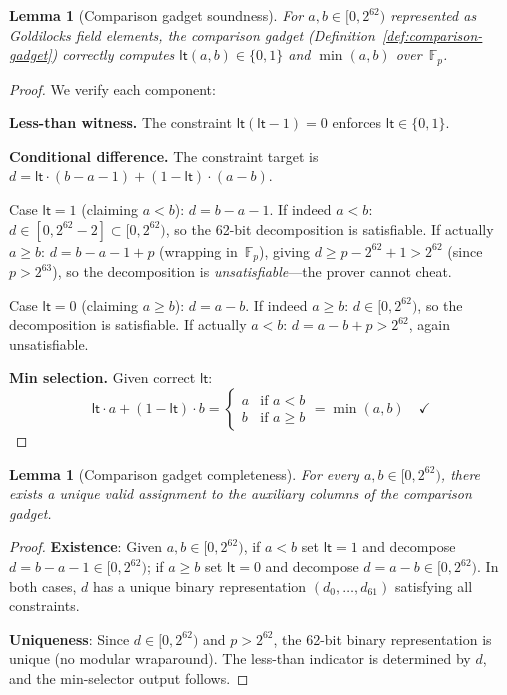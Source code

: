 \documentclass[11pt]{article}
\newtheorem{lemma}[theorem]{Lemma}
\newcommand{\F}{\mathbb{F}}
\begin{document}
\begin{lemma}[Comparison gadget soundness]\label{lem:comparison}
For $a, b \in [0, 2^{62})$ represented as Goldilocks field elements,
the comparison gadget (Definition~\ref{def:comparison-gadget})
correctly computes $\mathsf{lt}(a,b) \in \{0,1\}$ and
$\min(a,b)$ over~$\F_p$.
\end{lemma}

\begin{proof}
We verify each component:

\textbf{Less-than witness.}
The constraint $\mathsf{lt}(\mathsf{lt}-1)=0$ enforces
$\mathsf{lt} \in \{0,1\}$.

\textbf{Conditional difference.}
The constraint target is
$d = \mathsf{lt}\cdot(b - a - 1) + (1 - \mathsf{lt})\cdot(a - b)$.

Case $\mathsf{lt} = 1$ (claiming $a < b$):
$d = b - a - 1$.  If indeed $a < b$: $d \in [0, 2^{62} - 2] \subset [0, 2^{62})$,
so the 62-bit decomposition is satisfiable.
If actually $a \geq b$: $d = b - a - 1 + p$ (wrapping in~$\F_p$),
giving $d \geq p - 2^{62} + 1 > 2^{62}$ (since $p > 2^{63}$),
so the decomposition is \emph{unsatisfiable}---the prover
cannot cheat.

Case $\mathsf{lt} = 0$ (claiming $a \geq b$):
$d = a - b$.  If indeed $a \geq b$: $d \in [0, 2^{62})$,
so the decomposition is satisfiable.
If actually $a < b$: $d = a - b + p > 2^{62}$,
again unsatisfiable.

\textbf{Min selection.}
Given correct $\mathsf{lt}$:
\[
  \mathsf{lt} \cdot a + (1 - \mathsf{lt}) \cdot b
  = \begin{cases} a & \text{if } a < b \\ b & \text{if } a \geq b \end{cases}
  = \min(a,b) \quad \checkmark
\]
\end{proof}

\begin{lemma}[Comparison gadget completeness]\label{lem:comparison-complete}
For every $a, b \in [0, 2^{62})$, there exists a unique valid
assignment to the auxiliary columns of the comparison gadget.
\end{lemma}

\begin{proof}
\textbf{Existence}: Given $a, b \in [0, 2^{62})$, if $a < b$
set $\mathsf{lt}=1$ and decompose $d = b - a - 1 \in [0, 2^{62})$;
if $a \geq b$ set $\mathsf{lt}=0$ and decompose $d = a - b \in [0, 2^{62})$.
In both cases, $d$ has a unique binary representation $(d_0,\ldots,d_{61})$
satisfying all constraints.

\textbf{Uniqueness}: Since $d \in [0, 2^{62})$ and $p > 2^{62}$, the
62-bit binary representation is unique (no modular wraparound).
The less-than indicator is determined by $d$, and the min-selector
output follows.
\end{proof}
\end{document}
